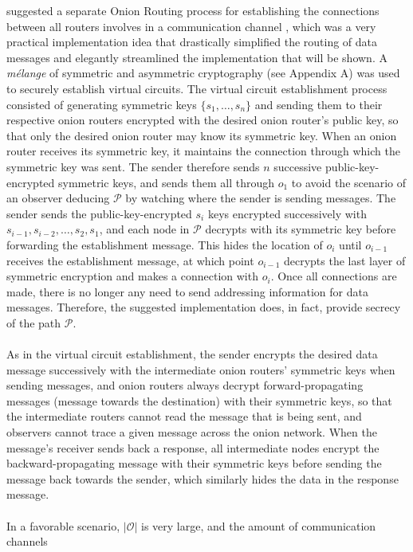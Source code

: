 \documentclass[10pt]{report}
\begin{document}
suggested a separate Onion Routing process for establishing the connections between all routers
involves in a communication channel \cite{OnionRoutingPatent,HidingRoutingInformation}, which was a
very practical implementation idea that drastically simplified the routing of data messages and
elegantly streamlined the implementation that will be shown. A \textit{m\'elange} of symmetric and
asymmetric cryptography (see Appendix A) was used to securely establish virtual circuits. The
virtual circuit establishment process consisted of generating symmetric keys $\{s_1,\dots,s_n\}$ and
sending them to their respective onion routers encrypted with the desired onion router's public key,
so that only the desired onion router may know its symmetric key. When an onion router receives its
symmetric key, it maintains the connection through which the symmetric key was sent. The sender
therefore sends $n$ successive public-key-encrypted symmetric keys, and sends them all through
$o_1$ to avoid the scenario of an observer deducing $\mathcal{P}$ by watching where the sender is
sending messages. The sender sends the public-key-encrypted $s_i$ keys encrypted successively with
$s_{i-1},s_{i-2},\dots,s_2,s_1$, and each node in $\mathcal{P}$ decrypts with its symmetric key
before forwarding the establishment message. This hides the location of $o_i$ until $o_{i-1}$
receives the establishment message, at which point $o_{i-1}$ decrypts the last layer of symmetric
encryption and makes a connection with $o_i$. Once all connections are made, there is no longer any
need to send addressing information for data messages. Therefore, the suggested implementation does,
in fact, provide secrecy of the path $\mathcal{P}$.\\\\
As in the virtual circuit establishment, the sender encrypts the desired data message successively
with the intermediate onion routers' symmetric keys when sending messages, and onion routers always
decrypt forward-propagating messages (message towards the destination) with their symmetric keys, so
that the intermediate routers cannot read the message that is being sent, and observers cannot trace
a given message across the onion network. When the message's receiver sends back a response, all
intermediate nodes encrypt the backward-propagating message with their symmetric keys before sending
the message back towards the sender, which similarly hides the data in the response message.\\\\
In a favorable scenario, $|\mathcal{O}|$ is very large, and the amount of communication channels
\end{document}
